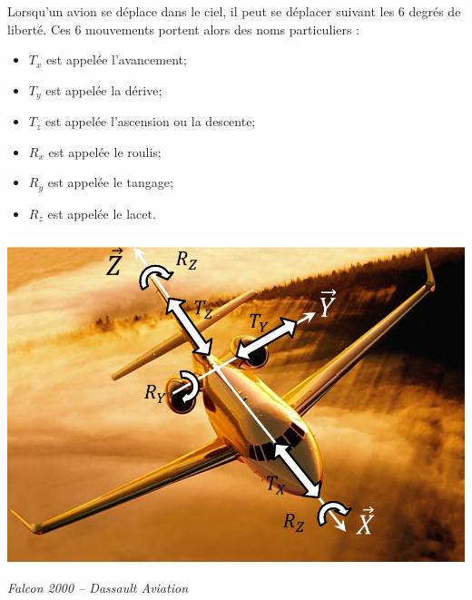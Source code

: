 \documentclass[10pt,oneside]{article}
\begin{document}
\begin{exemple}

\begin{minipage}[c]{.46\linewidth}
Lorsqu'un avion se déplace dans le ciel, il peut se déplacer suivant les 6 degrés de liberté. Ces 6 mouvements portent alors des noms particuliers : 
\begin{itemize}
\item $T_x$ est appelée l'avancement;
\item $T_y$ est appelée la dérive;
\item $T_z$ est appelée l'ascension ou la descente;
\item $R_x$ est appelée le roulis;
\item $R_y$ est appelée le tangage;
\item $R_z$ est appelée le lacet.
\end{itemize}
\end{minipage}\hfill
\begin{minipage}[c]{.46\linewidth}
\begin{center}
\includegraphics[width=.9\textwidth]{png/avion}

\textit{Falcon 2000 -- Dassault Aviation \cite{cite6}}
\end{center}
\end{minipage}

\vspace{.25cm}


\end{exemple}
\end{document}
